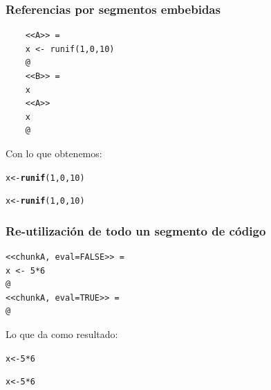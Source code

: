 \documentclass[10pt]{beamer}\usepackage[]{graphicx}\usepackage[]{color}
\makeatletter
\newcommand{\hlnum}[1]{\textcolor[rgb]{0.686,0.059,0.569}{#1}}%
\newcommand{\hlopt}[1]{\textcolor[rgb]{0,0,0}{#1}}%
\newcommand{\hlstd}[1]{\textcolor[rgb]{0.345,0.345,0.345}{#1}}%
\newcommand{\hlkwb}[1]{\textcolor[rgb]{0.69,0.353,0.396}{#1}}%
\newcommand{\hlkwd}[1]{\textcolor[rgb]{0.737,0.353,0.396}{\textbf{#1}}}%
\newenvironment{kframe}{%
 \def\at@end@of@kframe{}%
 \ifinner\ifhmode%
  \def\at@end@of@kframe{\end{minipage}}%
  \begin{minipage}{\columnwidth}%
 \fi\fi%
 \def\FrameCommand##1{\hskip\@totalleftmargin \hskip-\fboxsep
 \colorbox{shadecolor}{##1}\hskip-\fboxsep
     \hskip-\linewidth \hskip-\@totalleftmargin \hskip\columnwidth}%
 \MakeFramed {\advance\hsize-\width
   \@totalleftmargin\z@ \linewidth\hsize
   \@setminipage}}%
 {\par\unskip\endMakeFramed%
 \at@end@of@kframe}
\newenvironment{knitrout}{}{} %
\makeatother
\begin{document}
\begin{frame}[fragile]
\frametitle{Referencias por segmentos embebidas}
	\begin{lstlisting}
	<<A>> =
	x <- runif(1,0,10)
	@
	<<B>> =
	x
	<<A>>
	x
	@
	\end{lstlisting}
Con lo que obtenemos:
\begin{knitrout}
\color{fgcolor}\begin{kframe}
\begin{alltt}
\hlstd{x} \hlkwb{<-} \hlkwd{runif}\hlstd{(}\hlnum{1}\hlstd{,}\hlnum{0}\hlstd{,}\hlnum{10}\hlstd{)}
\end{alltt}
\end{kframe}
\end{knitrout}
\begin{knitrout}
\color{fgcolor}\begin{kframe}
\begin{alltt}
\hlstd{x} \hlkwb{<-} \hlkwd{runif}\hlstd{(}\hlnum{1}\hlstd{,}\hlnum{0}\hlstd{,}\hlnum{10}\hlstd{)}
\end{alltt}
\end{kframe}
\end{knitrout}
\end{frame}



\begin{frame}[fragile]
\frametitle{Re-utilización de todo un segmento de código}
	\begin{lstlisting}
<<chunkA, eval=FALSE>> =
x <- 5*6
@
<<chunkA, eval=TRUE>> =
@
	\end{lstlisting}
Lo que da como resultado:\\
\begin{knitrout}
\color{fgcolor}\begin{kframe}
\begin{alltt}
\hlstd{x} \hlkwb{<-} \hlnum{5}\hlopt{*}\hlnum{6}
\end{alltt}
\end{kframe}
\end{knitrout}
\begin{knitrout}
\color{fgcolor}\begin{kframe}
\begin{alltt}
\hlstd{x} \hlkwb{<-} \hlnum{5}\hlopt{*}\hlnum{6}
\end{alltt}
\end{kframe}
\end{knitrout}
\end{frame}
\end{document}
